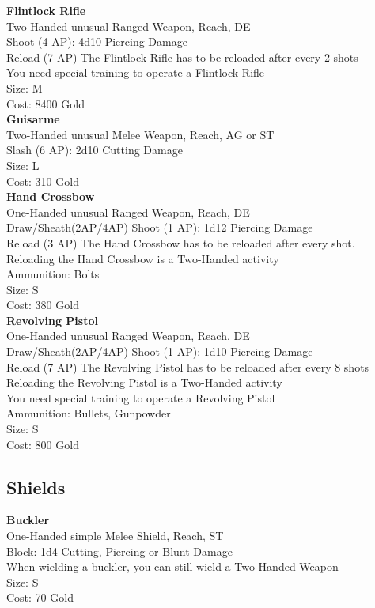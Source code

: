 \textbf{Flintlock Rifle}\label{weapon:flintlockRifle}\\
Two-Handed unusual Ranged Weapon,  Reach, DE\\
Shoot (4 AP): 4d10 Piercing Damage\\
Reload (7 AP) The Flintlock Rifle has to be reloaded after every 2 shots\\
You need special training to operate a Flintlock Rifle\\
Size: M\\
Cost: 8400 Gold\\

\textbf{Guisarme}\label{weapon:guisarme}\\
Two-Handed unusual Melee Weapon,  Reach, AG or ST\\
Slash (6 AP): 2d10 Cutting Damage\\
Size: L\\
Cost: 310 Gold\\

\textbf{Hand Crossbow}\label{weapon:handCrossbow}\\
One-Handed unusual Ranged Weapon,  Reach, DE\\
Draw/Sheath(2AP/4AP)
Shoot (1 AP): 1d12 Piercing Damage\\
Reload (3 AP) The Hand Crossbow has to be reloaded after every shot.\\
Reloading the Hand Crossbow is a Two-Handed activity\\
Ammunition: Bolts\\
Size: S\\
Cost: 380 Gold\\

\textbf{Revolving Pistol}\label{weapon:revolvingPistol}\\
One-Handed unusual Ranged Weapon,  Reach, DE\\
Draw/Sheath(2AP/4AP)
Shoot (1 AP): 1d10 Piercing Damage\\
Reload (7 AP) The Revolving Pistol has to be reloaded after every 8 shots\\
Reloading the Revolving Pistol is a Two-Handed activity\\
You need special training to operate a Revolving Pistol\\
Ammunition: Bullets, Gunpowder\\
Size: S\\
Cost: 800 Gold\\


\subsection{Shields}\label{subsec:shields}
\textbf{Buckler}\label{weapon:buckler}\\
One-Handed simple Melee Shield,  Reach, ST\\
Block: 1d4 Cutting, Piercing or Blunt Damage\\
When wielding a buckler, you can still wield a Two-Handed Weapon\\
Size: S\\
Cost: 70 Gold\\


